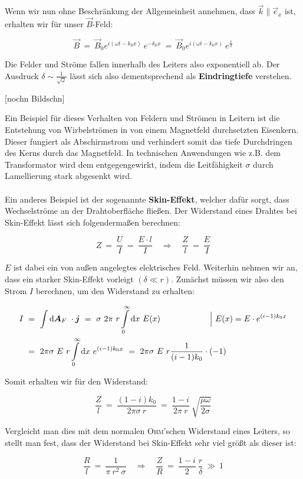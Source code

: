 Wenn wir nun ohne Beschränkung der Allgemeinheit annehmen, dass $\vec{k}\parallel\vec{e}_x$ ist, erhalten wir für unser $\vec{B}$-Feld:

\begin{equation*}
\vec{B} \ = \ \vec{B}_0 e^{i(\omega t-k_0 x)} \ e^{-k_0 x}  \ = \  \vec{B}_0 e^{i(\omega t-k_0 x)} \ e^{\frac{x}{\delta}}
\end{equation*}

Die Felder und Ströme fallen innerhalb des Leiters also exponentiell ab. Der Ausdruck $\delta\sim \frac{1}{\sqrt{\omega}}$ lässt sich also dementsprechend als \textbf{Eindringtiefe} verstehen.

[nochn Bildschn]

Ein Beispiel für dieses Verhalten von Feldern und Strömen in Leitern ist die Entstehung von Wirbelströmen in von einem Magnetfeld durchsetzten Eisenkern. Dieser fungiert als Abschirmstrom und verhindert somit das tiefe Durchdringen des Kerns durch das Magnetfeld. In technischen Anwendungen wie z.B. dem Transformator wird dem entgegengewirkt, indem die Leitfähigkeit $\sigma$ durch Lamellierung stark abgesenkt wird.\\
\ \\
Ein anderes Beispiel ist der sogenannte \textbf{Skin-Effekt}, welcher dafür sorgt, dass Wechselströme an der Drahtoberfläche fließen. Der Widerstand eines Drahtes bei Skin-Effekt lässt sich folgendermaßen berechnen:

\begin{equation*}
Z \ = \ \frac{U}{I} \ = \ \frac{E \cdot l}{I} \quad \Rightarrow \quad \frac{Z}{l} \ = \ \frac{E}{I}
\end{equation*}

$E$ ist dabei ein von außen angelegtes elektrisches Feld. Weiterhin nehmen wir an, dass ein starker Skin-Effekt vorleigt $(\delta\ll r)$. Zunächst müssen wir also den Strom $I$ berechnen, um den Widerstand zu erhalten:


\begin{align*}
I  \ &= \ \Int{}{}{\vec{A}_F}\cdot\vec{j} \ = \ \sigma \ 2 \pi \ r \Int{0}{\infty}{x} E(x) \qquad\qquad\qquad\Big| \ E(x) = E\cdot e^{(i-1)k_0 x}\\
&= \ 2\pi \sigma \ E \ r \Int{0}{\infty}{x}e^{(i-1)k_0 x}  \ = \ 2\pi\sigma \ E \ r  \frac{1}{(i-1)k_0}\cdot(-1) 
\end{align*}

Somit erhalten wir für den Widerstand:

\begin{equation*}
\frac{Z}{l}  \ = \ \frac{(1-i)k_0}{2\pi\sigma \ r} \ = \ \frac{1-i}{2\pi \ r}\ \sqrt{\frac{\mu\omega}{2\sigma}}
\end{equation*}

Vergleicht man dies mit dem normalen \textsc{Ohm}'schen Widerstand eines Leiters, so stellt man fest, dass der Widerstand bei Skin-Effekt sehr viel größt als dieser ist:

\begin{equation*}
\frac{R}{l} \ = \ \frac{1}{\pi \ r^2 \ \sigma} \quad \Rightarrow \quad \frac{Z}{R}  \ = \ \frac{1-i}{2} \ \frac{r}{\delta} \ \gg \ 1
\end{equation*}
